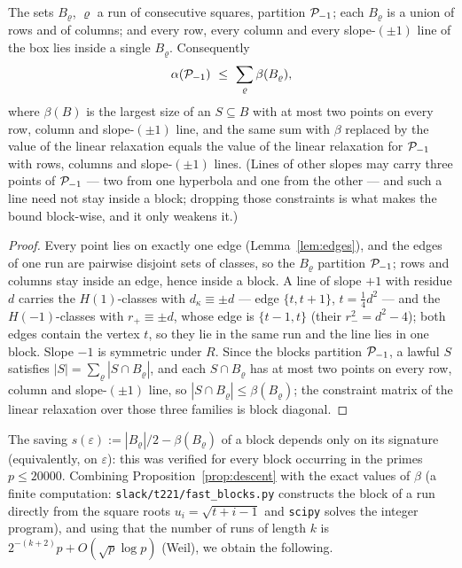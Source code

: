\begin{theorem}\label{thm:blocks}
The sets $B_\varrho$, $\varrho$ a run of consecutive squares, partition $\mathcal{P}_{-1}$; each $B_\varrho$ is a union of rows and of columns;
and every row, every column and every slope-$(\pm1)$ line of the box lies inside a single $B_\varrho$.  Consequently
\begin{equation}\label{eq:blocks}
 \alpha(\mathcal{P}_{-1})\ \le\ \sum_{\varrho}\beta(B_\varrho),
\end{equation}
where $\beta(B)$ is the largest size of an $S\subseteq B$ with at most two points on every row, column and slope-$(\pm1)$ line,
and the same sum with $\beta$ replaced by the value of the linear relaxation equals the value of the linear relaxation for
$\mathcal{P}_{-1}$ with rows, columns and slope-$(\pm1)$ lines.  (Lines of other slopes may carry three points of $\mathcal{P}_{-1}$ --- two from one
hyperbola and one from the other --- and such a line need not stay inside a block; dropping those constraints is what makes the bound
block-wise, and it only weakens it.)
\end{theorem}
\begin{proof}
Every point lies on exactly one edge (Lemma~\ref{lem:edges}), and the edges of one run are pairwise disjoint sets of classes, so the
$B_\varrho$ partition $\mathcal{P}_{-1}$; rows and columns stay inside an edge, hence inside a block.  A line of slope $+1$ with residue $d$
carries the $H(1)$-classes with $d_\kappa\equiv\pm d$ --- edge $\{t,t+1\}$, $t=\tfrac14d^2$ --- and the $H(-1)$-classes with $r_+\equiv\pm d$,
whose edge is $\{t-1,t\}$ (their $r_-^2=d^2-4$); both edges contain the vertex $t$, so they lie in the same run and the line lies in one
block.  Slope $-1$ is symmetric under $R$.  Since the blocks partition $\mathcal{P}_{-1}$, a lawful $S$ satisfies
$|S|=\sum_\varrho|S\cap B_\varrho|$, and each $S\cap B_\varrho$ has at most two points on every row, column and slope-$(\pm1)$ line, so
$|S\cap B_\varrho|\le\beta(B_\varrho)$; the constraint matrix of the linear relaxation over those three families is block diagonal.
\end{proof}



The saving $s(\varepsilon):=|B_\varrho|/2-\beta(B_\varrho)$ of a block depends only on its signature (equivalently, on $\varepsilon$): this was
verified for every block occurring in the primes $p\le20000$.  Combining Proposition~\ref{prop:descent} with the exact values of
$\beta$ (a finite computation: \texttt{slack/t221/fast\_blocks.py} constructs the block of a run directly from the square roots
$u_i=\sqrt{t+i-1}$ and \texttt{scipy} solves the integer program), and using that the number of runs of length $k$ is
$2^{-(k+2)}p+O(\sqrt p\log p)$ (Weil), we obtain the following.

